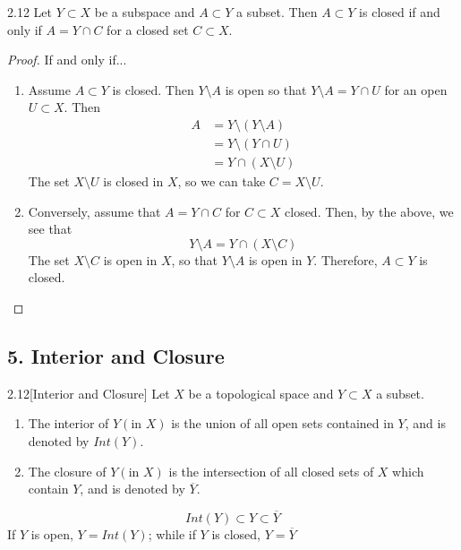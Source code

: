 \begin{customlemma}{2.12}
Let $Y \subset X$ be a subspace and $A \subset Y$ a subset. Then $A\subset Y$ is closed if and only if $A = Y \cap C$ for a closed set $C \subset X$. 
\end{customlemma}

\begin{proof} If and only if...
\begin{enumerate}
    \item[1).]Assume $A\subset Y$ is closed. Then $Y \setminus A$ is open so that $Y \setminus A = Y \cap U$ for an open $U \subset X$. Then
    \begin{align*}
        A & = Y \setminus\left(Y\setminus A\right)\\
          & = Y \setminus\left(Y \cap U\right)\\
          & = Y \cap \left(X \setminus U\right)
    \end{align*}
    The set $X \setminus U$ is closed in $X$, so we can take $C = X \setminus U$.
    \item[2).]Conversely, assume that $A = Y\cap C$ for $C \subset X$ closed. Then, by the above, we see that
    $$Y \setminus A = Y \cap \left(X \setminus C\right)$$
    The set $X \setminus C$ is open in $X$, so that $Y \setminus A$ is open in $Y$. Therefore, $A \subset Y$ is closed.
\end{enumerate}
\end{proof}

\subsection*{5. Interior and Closure}

\begin{customdefinition}{2.12}[Interior and Closure]
Let $X$ be a topological space and $Y \subset X$ a subset.
\begin{enumerate}
    \item[1).] The interior of $Y (\text{in }X)$ is the union of all open sets contained in $Y$, and is denoted by $Int(Y)$.
    \item[2).] The closure of $Y (\text{in }X)$ is the intersection of all closed sets of $X$ which contain $Y$, and is denoted by $\overline{Y}$.
\end{enumerate}
$$Int(Y) \subset Y \subset \overline{Y}$$
If $Y$ is open, $Y = Int(Y)$; while if $Y$ is closed, $Y = \overline{Y}$
\end{customdefinition}

